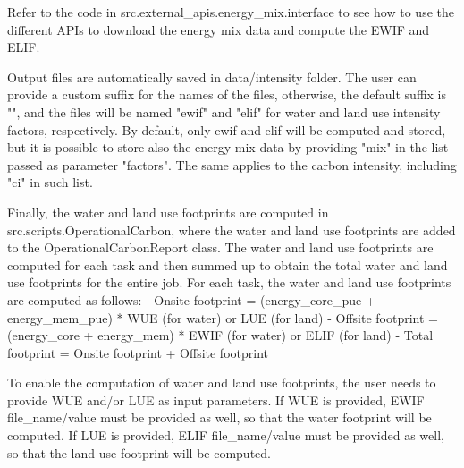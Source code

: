 Refer to the code in src.external_apis.energy_mix.interface to see how to use the different APIs to download the energy mix data and compute the EWIF and ELIF.

Output files are automatically saved in data/intensity folder. The user can provide a custom suffix for the names of the files, otherwise, the default suffix is "", and the files will be named "ewif" and "elif" for water and land use intensity factors, respectively. By default, only ewif and elif will be computed and stored, but it is possible to store also the energy mix data by providing "mix" in the list passed as parameter "factors". The same applies to the carbon intensity, including "ci" in such list.

Finally, the water and land use footprints are computed in src.scripts.OperationalCarbon, where the water and land use footprints are added to the OperationalCarbonReport class. The water and land use footprints are computed for each task and then summed up to obtain the total water and land use footprints for the entire job. 
For each task, the water and land use footprints are computed as follows:
    - Onsite footprint = (energy_core_pue + energy_mem_pue) * WUE (for water) or LUE (for land)
    - Offsite footprint = (energy_core + energy_mem) * EWIF (for water) or ELIF (for land)
    - Total footprint = Onsite footprint + Offsite footprint


To enable the computation of water and land use footprints, the user needs to provide WUE and/or LUE as input parameters. If WUE is provided, EWIF file_name/value must be provided as well, so that the water footprint will be computed. If LUE is provided, ELIF file_name/value must be provided as well, so that the land use footprint will be computed. 